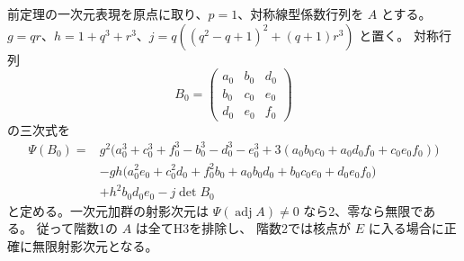 \begin{theorem}[一次元表現の射影次元の完全判定]
\label{thm:cubic-CY-three-alpha-elliptic-character-projective-dimension}
前定理の一次元表現を原点に取り、$p=1$、対称線型係数行列を $A$ とする。
$g=qr$、$h=1+q^3+r^3$、$j=q((q^2-q+1)^2+(q+1)r^3)$ と置く。
対称行列
\[
 B_0=\begin{pmatrix}a_0&b_0&d_0\\b_0&c_0&e_0\\d_0&e_0&f_0\end{pmatrix}
\]
の三次式を
\[
\begin{aligned}
 \Psi(B_0)={}&g^2\bigl(a_0^3+c_0^3+f_0^3-b_0^3-d_0^3-e_0^3
        +3(a_0b_0c_0+a_0d_0f_0+c_0e_0f_0)\bigr)\\
 &-gh\bigl(a_0^2e_0+c_0^2d_0+f_0^2b_0+a_0b_0d_0+b_0c_0e_0+d_0e_0f_0\bigr)\\
 &+h^2 b_0d_0e_0-j\det B_0
\end{aligned}
\]
と定める。一次元加群の射影次元は
$\Psi(\operatorname{adj} A)\ne0$ なら2、零なら無限である。
従って階数1の $A$ は全てH3を排除し、
階数2では核点が $E$ に入る場合に正確に無限射影次元となる。
\end{theorem}
